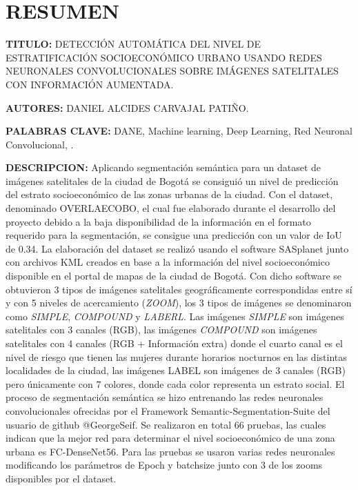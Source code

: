 	\setlength{\parskip}{\baselineskip} %


	\newpage\chapter*{RESUMEN}
    \textbf{TITULO:} DETECCIÓN AUTOMÁTICA DEL NIVEL DE ESTRATIFICACIÓN SOCIOECONÓMICO URBANO USANDO REDES NEURONALES CONVOLUCIONALES SOBRE IMÁGENES SATELITALES CON INFORMACIÓN AUMENTADA.
    
    \textbf{AUTORES:} DANIEL ALCIDES CARVAJAL PATIÑO.
    
    \textbf{PALABRAS CLAVE:} DANE, Machine learning, Deep Learning, Red Neuronal Convolucional, .	
    
    \textbf{DESCRIPCION:} Aplicando segmentación semántica para un dataset de imágenes satelitales de la ciudad de Bogotá se consiguió un nivel de predicción del estrato socioeconómico de las zonas urbanas de la ciudad. Con el dataset, denominado OVERLAECOBO, el cual fue elaborado durante el desarrollo del proyecto debido a la baja disponibilidad de la información en el formato requerido para la segmentación, se consigue una predicción con un valor de IoU de 0.34. La elaboración del dataset se realizó usando el software SASplanet junto con archivos KML creados en base a la información del nivel socioeconómico disponible en el portal de mapas de la ciudad de Bogotá. Con dicho software se obtuvieron 3 tipos de imágenes satelitales geográficamente correspondidas entre sí y con 5 niveles de acercamiento (\textit{ZOOM}), los 3 tipos de imágenes se denominaron como \textit{SIMPLE}, \textit{COMPOUND} y \textit{LABERL}. Las imágenes \textit{SIMPLE} son imágenes satelitales con 3 canales (RGB), las imágenes \textit{COMPOUND} son imágenes satelitales con 4 canales (RGB + Información extra) donde el cuarto canal es el nivel de riesgo que tienen las mujeres durante horarios nocturnos en las distintas localidades de la ciudad, las imágenes LABEL son imágenes de 3 canales (RGB) pero únicamente con 7 colores, donde cada color representa un estrato social. El proceso de segmentación semántica se hizo entrenando las redes neuronales convolucionales ofrecidas por el Framework Semantic-Segmentation-Suite del usuario de github @GeorgeSeif. Se realizaron en total 66 pruebas, las cuales indican que la mejor red para determinar el nivel socioeconómico de una zona urbana es FC-DenseNet56. Para las pruebas se usaron varias redes neuronales modificando los parámetros de Epoch y batchsize junto con 3 de los zooms disponibles por el dataset. 
 
